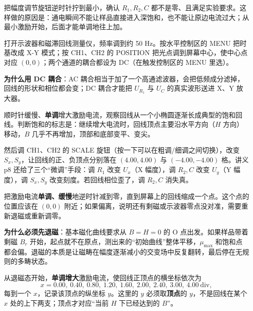 \documentclass[11pt]{ctexart}
\begin{document}

把幅度调节旋钮逆时针拧到最小，确认 \(R_1,R_2,C\) 都不是零、且满足实验要求。这样做的原因是：通电瞬间不能让样品直接进入深饱和，也不能让原边电流过大；从最小激励开始，后面才能单调地往上加。


打开示波器和磁滞回线测量仪，频率调到约 50 Hz。按水平控制区的 MENU 把时基改成 X-Y 模式；按 CH1、CH2 的 POSITION 把光点调到屏幕中心，使中心点对应 \((0,0)\)；两个通道的耦合都设为 DC（在触发控制区的 MENU 里选）。

\textbf{为什么用 DC 耦合}：AC 耦合相当于加了一个高通滤波器，会把低频成分滤掉，回线的形状和相位都会变；DC 耦合才能把 \(U_{R_1}\) 与 \(U_C\) 的真实波形送进 X、Y 放大器。


顺时针缓慢、\textbf{单调}增大激励电流，观察回线从一个小椭圆逐渐长成典型的饱和回线。判断饱和的标志是：继续增大电流时，回线顶点主要沿水平方向（\(H\) 方向）移动，\(B\) 几乎不再增加，顶部和底部变平、变尖。

然后调 CH1、CH2 的 SCALE 旋钮（按一下可以在粗调/细调之间切换），改变 \(S_x,S_y\)，让回线的正、负顶点分别落在 \((4.00,4.00)\) 与 \((-4.00,-4.00)\) 格。讲义 p8 还给了三个“微调”手段：调 \(R_1\) 改变 \(U_x\)（X 幅度），调 \(R_2,C\) 改变 \(U_y\)（Y 幅度），调 \(S_x,S_y\) 改变刻度。若回线相位歪了，调 \(R_2,C\) 消失真。



把激励电流\textbf{单调、缓慢}地逆时针减到零，直到屏幕上的回线缩成一个点。这个点的位置应该在 \((0,0)\) 附近；如果偏离，说明还有剩磁或示波器零点没对准，需要重新退磁或重新调零。

\textbf{为什么必须先退磁}：基本磁化曲线要求从 \(B=H=0\) 的 O 点出发。如果样品带着剩磁 \(B_r\) 开始，起点就不在原点，测出来的“初始曲线”整体平移，\(\mu_{\max}\) 和饱和点都会偏。退磁的本质是让磁畴在幅度逐渐减小的交变场中反复翻转，最后停在无规则的多畴状态。


从退磁态开始，\textbf{单调增大}激励电流，使回线正顶点的横坐标依次为
\[
x=0.00,\ 0.40,\ 0.80,\ 1.20,\ 1.60,\ 2.00,\ 2.40,\ 3.00,\ 4.00\ \mathrm{div},
\]
每到一个 \(x\)，记录该顶点的纵坐标 \(y\)。这里的 \(y\) 必须取\textbf{顶点}的 \(y\)，不是回线在某个 \(x\) 处的上下两支；顶点才对应“当前 \(H\) 下已经达到的 \(B\)”。
\end{document}
